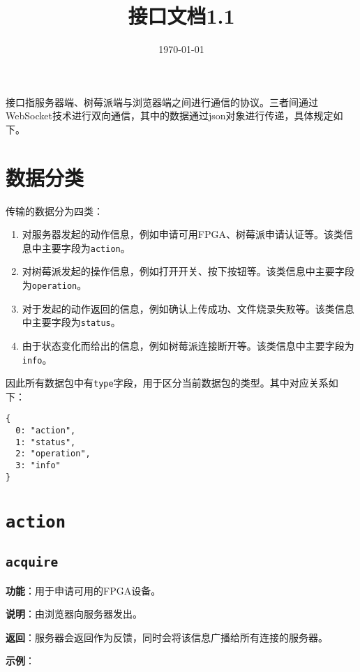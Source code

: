 \documentclass{article}
\title{接口文档1.1}
\author{\today}
\date{}
\begin{document}
\maketitle

\tableofcontents
\newpage

接口指服务器端、树莓派端与浏览器端之间进行通信的协议。三者间通过WebSocket技术进行双向通信，其中的数据通过json对象进行传递，具体规定如下。

\section{数据分类}

传输的数据分为四类：
\begin{enumerate}
\item 对服务器发起的动作信息，例如申请可用FPGA、树莓派申请认证等。该类信息中主要字段为\texttt{action}。
\item 对树莓派发起的操作信息，例如打开开关、按下按钮等。该类信息中主要字段为\texttt{operation}。
\item 对于发起的动作返回的信息，例如确认上传成功、文件烧录失败等。该类信息中主要字段为\texttt{status}。
\item 由于状态变化而给出的信息，例如树莓派连接断开等。该类信息中主要字段为\texttt{info}。
\end{enumerate}

因此所有数据包中有\texttt{type}字段，用于区分当前数据包的类型。其中对应关系如下：
\begin{lstlisting}[style=json]
{
  0: "action",
  1: "status",
  2: "operation",
  3: "info"
}
\end{lstlisting}

\section{\texttt{action}}

\subsection{\texttt{acquire}}
\label{act:acquire}

\noindent\textbf{功能}：用于申请可用的FPGA设备。

\noindent\textbf{说明}：由浏览器向服务器发出。

\noindent\textbf{返回}：服务器会返回\texttt{}作为反馈，同时会将该信息广播给所有连接的服务器。

\noindent\textbf{示例}：
\end{document}
